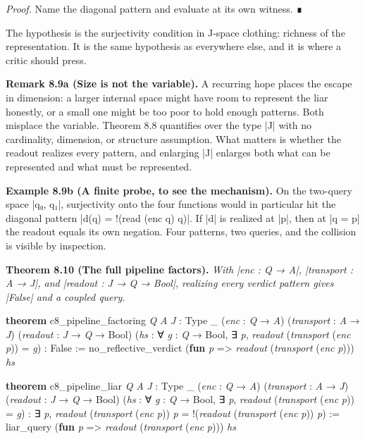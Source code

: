 \documentclass{memoir}
\begin{document}
\emph{Proof.} Name the diagonal pattern and evaluate at its own witness. ∎

The hypothesis is the surjectivity condition in J-space clothing: richness of
the representation. It is the same hypothesis as everywhere else, and it is
where a critic should press.

\textbf{Remark 8.9a (Size is not the variable).} A recurring hope places the escape in
dimension: a larger internal space might have room to represent the liar
honestly, or a small one might be too poor to hold enough patterns. Both
misplace the variable. Theorem 8.8 quantifies over the type \LeanVerb|J| with no
cardinality, dimension, or structure assumption. What matters is whether the
readout realizes every pattern, and enlarging \LeanVerb|J| enlarges both what can be
represented and what must be represented.

\textbf{Example 8.9b (A finite probe, to see the mechanism).} On the two-query space
\LeanVerb|q₀, q₁|, surjectivity onto the four functions would in particular hit the
diagonal pattern \LeanVerb|d(q) = !(read (enc q) q)|. If \LeanVerb|d| is realized at \LeanVerb|p|, then at
\LeanVerb|q = p| the readout equals its own negation. Four patterns, two queries, and the
collision is visible by inspection.

\textbf{Theorem 8.10 (The full pipeline factors).} \emph{With \LeanVerb|enc : Q → A|,
\LeanVerb|transport : A → J|, and \LeanVerb|readout : J → Q → Bool|, realizing every verdict
pattern gives \LeanVerb|False| and a coupled query.}

\begin{LeanVerbatim}
\textbf{theorem} c8_pipeline_factoring \textit{Q} \textit{A} \textit{J} : Type _
    (\textit{enc} : \textit{Q} → \textit{A}) (\textit{transport} : \textit{A} → \textit{J})
    (\textit{readout} : \textit{J} → \textit{Q} → Bool)
    (\textit{hs} : ∀ \textit{g} : \textit{Q} → Bool,
      ∃ \textit{p}, \textit{readout} (\textit{transport} (\textit{enc} \textit{p})) = \textit{g}) :
    False :=
  no_reflective_verdict
      (\textbf{fun} \textit{p} => \textit{readout} (\textit{transport} (\textit{enc} \textit{p}))) \textit{hs}

\textbf{theorem} c8_pipeline_liar \textit{Q} \textit{A} \textit{J} : Type _
    (\textit{enc} : \textit{Q} → \textit{A}) (\textit{transport} : \textit{A} → \textit{J})
    (\textit{readout} : \textit{J} → \textit{Q} → Bool)
    (\textit{hs} : ∀ \textit{g} : \textit{Q} → Bool,
      ∃ \textit{p}, \textit{readout} (\textit{transport} (\textit{enc} \textit{p})) = \textit{g}) :
    ∃ \textit{p}, \textit{readout} (\textit{transport} (\textit{enc} \textit{p})) \textit{p}
      = !(\textit{readout} (\textit{transport} (\textit{enc} \textit{p})) \textit{p}) :=
  liar_query (\textbf{fun} \textit{p} => \textit{readout} (\textit{transport} (\textit{enc} \textit{p}))) \textit{hs}

\end{LeanVerbatim}
\end{document}

